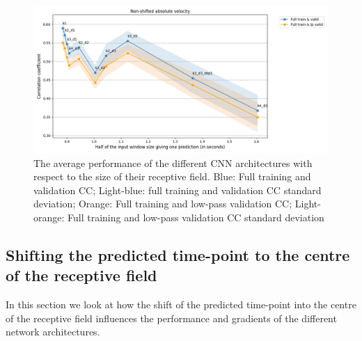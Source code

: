 \begin{figure}[!htbp]
\centering
   \includegraphics[width=1\linewidth]{img/ch4/distance-shifted-performance-absVel}
   \caption[Dependence of performance on receptive field size]{The average performance of the different CNN architectures with respect to the size of their receptive field. Blue: Full training and validation CC; Light-blue: full training and validation CC standard deviation; Orange: Full training and low-pass validation CC; Light-orange: Full training and low-pass validation CC standard deviation}
   \label{fig:figure-distance}
\end{figure}

\subsection{Shifting the predicted time-point to the centre of the receptive field}\label{subsec:shifting-the-predicted-time-point-to-the-centre-of-the-receptive-field}
In this section we look at how the shift of the predicted time-point into the centre of the receptive field influences the performance and gradients of the different network architectures.

